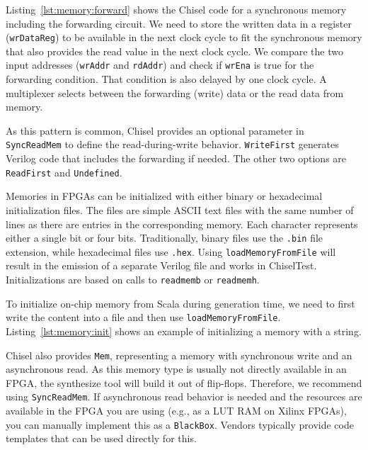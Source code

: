 \documentclass[%
    10pt,
    headinclude, footexclude,
    openright, %
    notitlepage,
    cleardoubleempty,
    headsepline,
    pointlessnumbers,
    bibtotoc, idxtotoc,
    ]{scrbook}
\newcommand{\code}[1]{{\lstinline[basicstyle=\small\ttfamily]{#1}}}
\begin{document}
Listing~\ref{lst:memory:forward} shows the Chisel code for a synchronous memory
including the forwarding circuit. We need to store the written data in a register
(\code{wrDataReg}) to be available in the next clock cycle to fit
the synchronous memory that also provides the read value in the next clock
cycle.
We compare the two input addresses (\code{wrAddr} and \code{rdAddr})
and check if \code{wrEna} is true for the forwarding condition.
That condition is also delayed by one clock cycle.
A multiplexer selects between the forwarding (write) data or the read
data from memory.


As this pattern is common, Chisel provides an optional parameter in \code{SyncReadMem}
to define the read-during-write behavior. \code{WriteFirst} generates Verilog code that
includes the forwarding if needed. The other two options are \code{ReadFirst}
and \code{Undefined}.


Memories in FPGAs can be initialized with either binary or hexadecimal initialization files.
The files are simple ASCII text files with the same number of lines as there are
entries in the corresponding memory. Each character represents either a single bit
or four bits. Traditionally, binary files use the \code{.bin} file extension, while
hexadecimal files use \code{.hex}. Using \code{loadMemoryFromFile} will result in
the emission of a separate Verilog file and works in ChiselTest.
Initializations are based on calls to \code{readmemb} or \code{readmemh}.

To initialize on-chip memory from Scala during generation time, we need to first
write the content into a file and then use \code{loadMemoryFromFile}.
Listing~\ref{lst:memory:init} shows an example of initializing a memory with a string.



Chisel also provides \code{Mem}, representing a memory with synchronous
write and an asynchronous read. As this memory type is usually not directly available
in an FPGA, the synthesize tool will build it out of flip-flops.
Therefore, we recommend using \code{SyncReadMem}. If asynchronous read behavior is needed and
the resources are available in the FPGA you are using (e.g., as a LUT RAM on Xilinx
FPGAs), you can manually implement this as a \code{BlackBox}. Vendors typically provide
code templates that can be used directly for this.
\end{document}
